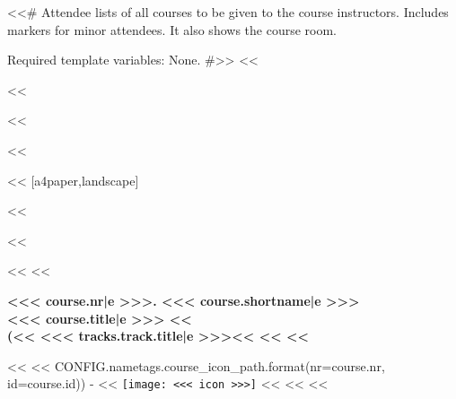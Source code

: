 <<# Attendee lists of all courses to be given to the course instructors. Includes markers for minor attendees. It also
    shows the course room.

    Required template variables: None.
#>>
<<%

<<%

<<%
    \usepackage{pgfpages}
<<%

<<%
    \geometry{top=1cm,bottom=1cm,left=1cm,right=1cm}
    [a4paper,landscape] %

    \ifoot[]{}
    \ihead[]{}
    \cfoot[]{}
    \ofoot[]{}
<<%

<<%

<<%
    <<%

        \begin{minipage}[t]{\textwidth-2.5cm}%
            \vspace{0pt}
            \raggedright
            \headingfamily\bfseries\Large{}<<< course.nr|e >>>. <<< course.shortname|e >>>\\
            \normalsize{}<<< course.title|e >>>
            <<%
                \\
                (<<%
                    <<< tracks.track.title|e >>><<%
                <<%
            <<%
        \end{minipage}%
        \hspace{0.5cm}%
        \begin{minipage}[t][2cm][t]{2cm}
            \vspace{0pt}
            <<%
                <<%
                        CONFIG.nametags.course_icon_path.format(nr=course.nr, id=course.id)) -%
                    <<%
                        \texttt{[image: <<< icon >>>]}%
                    <<%
                <<%
            <<%
        \end{minipage}

